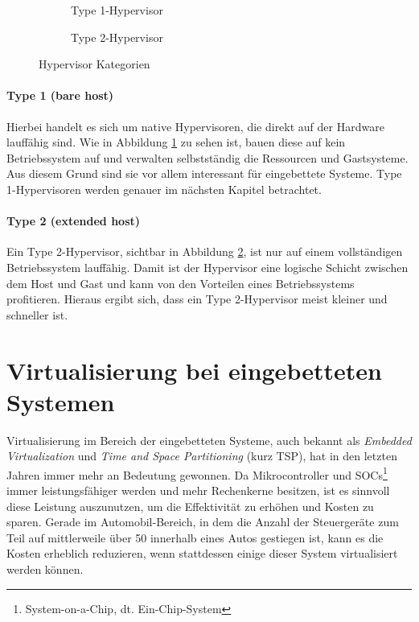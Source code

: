 \documentclass[
  a4paper,					    %
  twoside,
  DIV=calc,     				%
  bibliography=totoc,
  cleardoublepage=empty,
  ngerman,     					%
  final       					%
]{scrbook}
\begin{document}
\begin{figure}
    \centering
    \begin{subfigure}[b]{0.49\textwidth}
        \centering
        
        \caption{Type 1-Hypervisor}
        \label{fig:hypervisor_type1}
    \end{subfigure}
    \begin{subfigure}[b]{0.49\textwidth}
        \centering
        
        \caption{Type 2-Hypervisor}
        \label{fig:hypervisor_type2}
    \end{subfigure}
    \caption{Hypervisor Kategorien}
    \label{fig:hypervisor}
\end{figure}

\paragraph{Type 1 (bare host)} Hierbei handelt es sich um native Hypervisoren, die direkt auf der Hardware lauffähig sind. Wie in Abbildung \ref{fig:hypervisor_type1} zu sehen ist, bauen diese auf kein Betriebssystem auf und verwalten selbstständig die Ressourcen und Gastsysteme. Aus diesem Grund sind sie vor allem interessant für eingebettete Systeme. Type 1-Hypervisoren werden genauer im nächsten Kapitel betrachtet.

\paragraph{Type 2 (extended host)} Ein Type 2-Hypervisor, sichtbar in Abbildung \ref{fig:hypervisor_type2}, ist nur auf einem vollständigen Betriebssystem lauffähig. Damit ist der Hypervisor eine logische Schicht zwischen dem Host und Gast und kann von den Vorteilen eines Betriebssystems profitieren. Hieraus ergibt sich, dass ein Type 2-Hypervisor meist kleiner und schneller ist.





\section{Virtualisierung bei eingebetteten Systemen}
\label{sec:EVirtualisierung}
Virtualisierung im Bereich der eingebetteten Systeme, auch bekannt als \emph{Embedded Virtualization} und \emph{Time and Space Partitioning} (kurz TSP), hat in den letzten Jahren immer mehr an Bedeutung gewonnen. Da Mikrocontroller und SOCs\footnote{System-on-a-Chip, dt. Ein-Chip-System} immer leistungsfähiger werden und mehr Rechenkerne besitzen, ist es sinnvoll diese Leistung auszunutzen, um die Effektivität zu erhöhen und Kosten zu sparen. Gerade im Automobil-Bereich, in dem die Anzahl der Steuergeräte zum Teil auf mittlerweile über 50 innerhalb eines Autos gestiegen ist, kann es die Kosten erheblich reduzieren, wenn stattdessen einige dieser System virtualisiert werden können.
\end{document}
